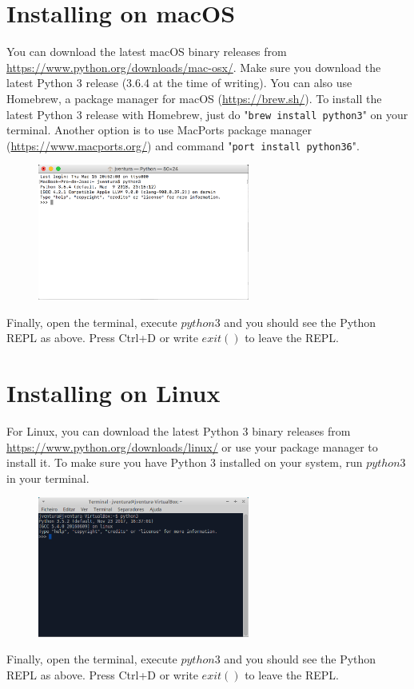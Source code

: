\section{Installing on macOS}

You can download the latest macOS binary releases from \url{https://www.python.org/downloads/mac-osx/}. Make sure you download the latest Python 3 release (3.6.4 at the time of writing). You can also use Homebrew, a package manager for macOS (\url{https://brew.sh/}). To install the latest Python 3 release with Homebrew, just do "\texttt{brew install python3}" on your terminal. Another option is to use MacPorts package manager (\url{https://www.macports.org/}) and command "\texttt{port install python36}".  


\begin{figure}[H]
	\centering
  	\includegraphics[width=0.62\textwidth]{images/python_macos.png}
\end{figure}

Finally, open the terminal, execute $python3$ and you should see the Python REPL as above. Press Ctrl+D or write $exit()$ to leave the REPL.

\section{Installing on Linux}

For Linux, you can download the latest Python 3 binary releases from \url{https://www.python.org/downloads/linux/} or use your package manager to install it. To make sure you have Python 3 installed on your system, run $python3$ in your terminal.

\begin{figure}[H]
	\centering
  	\includegraphics[width=0.62\textwidth]{images/python_linux.png}
\end{figure}

Finally, open the terminal, execute $python3$ and you should see the Python REPL as above. Press Ctrl+D or write $exit()$ to leave the REPL.
